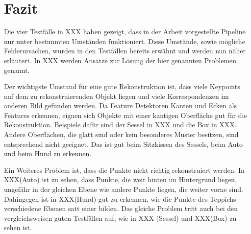 
\chapter{Fazit}
\label{sec:conclusion}

Die vier Testfälle in XXX haben gezeigt, dass in der Arbeit vorgestellte Pipeline nur unter bestimmten Umständen funktioniert.
Diese Umstände, sowie mögliche Fehlerursachen, wurden in den Testfällen bereits erwähnt und werden nun näher erläutert.
In XXX werden Ansätze zur Lösung der hier genannten Problemen genannt.

Der wichtigste Umstand für eine gute Rekonstruktion ist, dass viele Keypoints auf dem zu rekonstruierenden Objekt liegen und viele Korrespondenzen im anderen Bild gefunden werden.
Da Feature Detektoren Kanten und Ecken als Features erkennen, eignen sich Objekte mit einer kantigen Oberfläche gut für die Rekonstruktion.
Beispiele dafür sind der Sessel in XXX und die Box in XXX.
Andere Oberflächen, die glatt sind oder kein besonderes Muster besitzen, sind entsprechend nicht geeignet.
Das ist gut beim Sitzkissen des Sessels, beim Auto und beim Hund zu erkennen. 

Ein Weiteres Problem ist, dass die Punkte nicht richtig rekonstruiert werden.
In XXX(Auto) ist zu sehen, dass Punkte, die weit hinten im Hintergrund liegen, ungefähr in der gleichen Ebene wie andere Punkte liegen, die weiter vorne sind.  
Dahingegen ist in XXX(Hund) gut zu erkennen, wie die Punkte des Teppichs verschiedene Ebenen satt einer bilden.
Das gleiche Problem tritt auch bei den vergleichsweisen guten Testfällen auf, wie in XXX (Sessel) und XXX(Box) zu sehen ist.

